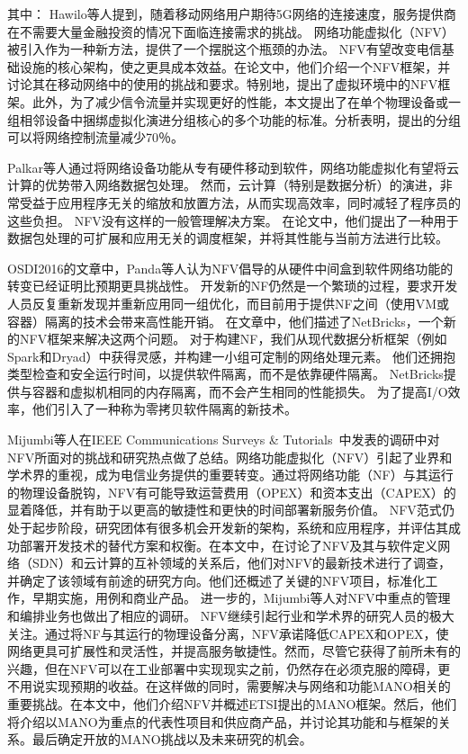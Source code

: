 其中：
Hawilo等人提到，随着移动网络用户期待5G网络的连接速度，服务提供商在不需要大量金融投资的情况下面临连接需求的挑战。 网络功能虚拟化（NFV）被引入作为一种新方法，提供了一个摆脱这个瓶颈的办法。 NFV有望改变电信基础设施的核心架构，使之更具成本效益。在论文中，他们介绍一个NFV框架，并讨论其在移动网络中的使用的挑战和要求。特别地，提出了虚拟环境中的NFV框架。此外，为了减少信令流量并实现更好的性能，本文提出了在单个物理设备或一组相邻设备中捆绑虚拟化演进分组核心的多个功能的标准。分析表明，提出的分组可以将网络控制流量减少70％。

Palkar等人通过将网络设备功能从专有硬件移动到软件，网络功能虚拟化有望将云计算的优势带入网络数据包处理。 然而，云计算（特别是数据分析）的演进，非常受益于应用程序无关的缩放和放置方法，从而实现高效率，同时减轻了程序员的这些负担。 NFV没有这样的一般管理解决方案。 在论文中，他们提出了一种用于数据包处理的可扩展和应用无关的调度框架，并将其性能与当前方法进行比较。

OSDI2016的文章中，Panda等人认为NFV倡导的从硬件中间盒到软件网络功能的转变已经证明比预期更具挑战性。 开发新的NF仍然是一个繁琐的过程，要求开发人员反复重新发现并重新应用同一组优化，而目前用于提供NF之间（使用VM或容器）隔离的技术会带来高性能开销。 在文章中，他们描述了NetBricks，一个新的NFV框架来解决这两个问题。 对于构建NF，我们从现代数据分析框架（例如Spark和Dryad）中获得灵感，并构建一小组可定制的网络处理元素。 他们还拥抱类型检查和安全运行时间，以提供软件隔离，而不是依靠硬件隔离。 NetBricks提供与容器和虚拟机相同的内存隔离，而不会产生相同的性能损失。 为了提高I/O效率，他们引入了一种称为零拷贝软件隔离的新技术。

Mijumbi等人在IEEE Communications Surveys \& Tutorials 中发表的调研中对NFV所面对的挑战和研究热点做了总结。网络功能虚拟化（NFV）引起了业界和学术界的重视，成为电信业务提供的重要转变。通过将网络功能（NF）与其运行的物理设备脱钩，NFV有可能导致运营费用（OPEX）和资本支出（CAPEX）的显着降低，并有助于以更高的敏捷性和更快的时间部署新服务价值。 NFV范式仍处于起步阶段，研究团体有很多机会开发新的架构，系统和应用程序，并评估其成功部署开发技术的替代方案和权衡。在本文中，在讨论了NFV及其与软件定义网络（SDN）和云计算的互补领域的关系后，他们对NFV的最新技术进行了调查，并确定了该领域有前途的研究方向。他们还概述了关键的NFV项目，标准化工作，早期实施，用例和商业产品。
进一步的，Mijumbi等人对NFV中重点的管理和编排业务也做出了相应的调研。
NFV继续引起行业和学术界的研究人员的极大关注。通过将NF与其运行的物理设备分离，NFV承诺降低CAPEX和OPEX，使网络更具可扩展性和灵活性，并提高服务敏捷性。然而，尽管它获得了前所未有的兴趣，但在NFV可以在工业部署中实现现实之前，仍然存在必须克服的障碍，更不用说实现预期的收益。在这样做的同时，需要解决与网络和功能MANO相关的重要挑战。在本文中，他们介绍NFV并概述ETSI提出的MANO框架。然后，他们将介绍以MANO为重点的代表性项目和供应商产品，并讨论其功能和与框架的关系。最后确定开放的MANO挑战以及未来研究的机会。

